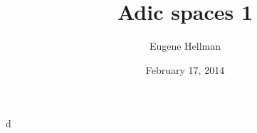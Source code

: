 \documentclass{article}
\title{Adic spaces 1}
\author{Eugene Hellman}
\date{February 17, 2014}
\begin{document}
\maketitle





d
\end{document}
